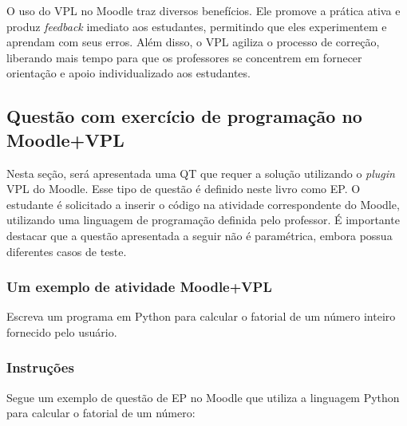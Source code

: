O uso do VPL no Moodle traz diversos benefícios. Ele promove a prática ativa e produz \textit{feedback} imediato aos estudantes, permitindo que eles experimentem e aprendam com seus erros. Além disso, o VPL agiliza o processo de correção, liberando mais tempo para que os professores se concentrem em fornecer orientação e apoio individualizado aos estudantes.

\subsection{Questão com exercício de programação no Moodle+VPL}

Nesta seção, será apresentada uma QT que requer a solução utilizando o \textit{
plugin} VPL do Moodle. Esse tipo de questão é definido neste livro como EP. O estudante é solicitado a inserir o código na atividade correspondente do Moodle, utilizando uma linguagem de programação definida pelo professor. É importante destacar que a questão apresentada a seguir não é paramétrica, embora possua diferentes casos de teste.

\subsubsection{Um exemplo de atividade Moodle+VPL}

Escreva um programa em Python para calcular o fatorial de um número inteiro fornecido pelo usuário.

\subsubsection{Instruções}

Segue um exemplo de questão de EP no Moodle que utiliza a linguagem Python para calcular o fatorial de um número:

